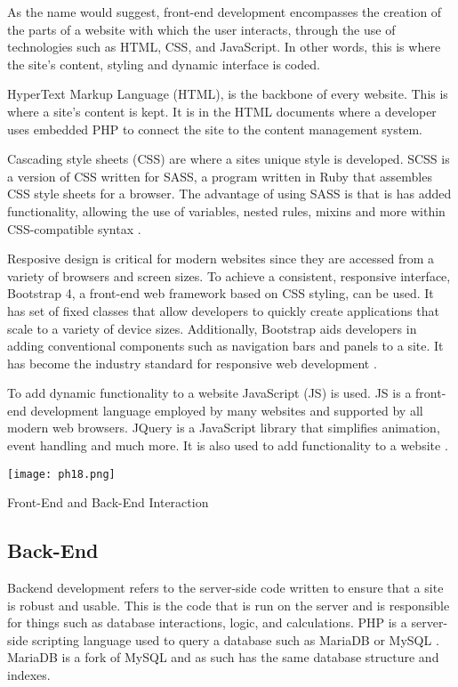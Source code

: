 \documentclass[fontsize=11pt]{extarticle}
\numberwithin{figure}{section} %
\begin{document}
As the name would suggest, front-end development encompasses the
creation of the parts of a website with which the user interacts,
through the use of technologies such as HTML, CSS, and JavaScript. In
other words, this is where the site's content, styling and dynamic
interface is coded.

HyperText Markup Language (HTML), is the backbone of every website. This
is where a site's content is kept. It is in the HTML documents where a
developer uses embedded PHP to connect the site to the content
management system.

Cascading style sheets (CSS) are where a sites unique style is
developed. SCSS is a version of CSS written for SASS, a program written
in Ruby that assembles CSS style sheets for a browser. The advantage of
using SASS is that is has added functionality, allowing the use of
variables, nested rules, mixins and more within CSS-compatible syntax
\cite{p14}.

Resposive design is critical for modern websites since they are accessed
from a variety of browsers and screen sizes. To achieve a consistent,
responsive interface, Bootstrap 4, a front-end web framework based on
CSS styling, can be used. It has set of fixed classes that allow
developers to quickly create applications that scale to a variety of
device sizes. Additionally, Bootstrap aids developers in adding
conventional components such as navigation bars and panels to a site. It
has become the industry standard for responsive web development
\cite{p15}.

To add dynamic functionality to a website JavaScript (JS) is used. JS is
a front-end development language employed by many websites and supported
by all modern web browsers. JQuery is a JavaScript library that
simplifies animation, event handling and much more. It is also used to
add functionality to a website \cite{p16}.

\begin{table}[H]
      \centering
      \texttt{[image: ph18.png]}
      \caption{Front-End and Back-End Interaction}
 \end{table}

\hypertarget{back-end}{%
\subsection{Back-End}\label{back-end}}

Backend development refers to the server-side code written to ensure
that a site is robust and usable. This is the code that is run on the
server and is responsible for things such as database interactions,
logic, and calculations. PHP is a server-side scripting language used to
query a database such as MariaDB or MySQL \cite{p17}. MariaDB is a fork
of MySQL and as such has the same database structure and indexes.
\cite{p24}
\end{document}
